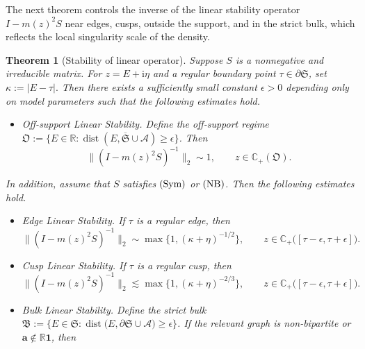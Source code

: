 \documentclass[11pt,twoside, a4paper]{article}
\numberwithin{equation}{section}
\numberwithin{figure}{section}
\theoremstyle{plain} %
\newtheorem{theorem}{Theorem}[section]
\theoremstyle{definition}
\theoremstyle{remark}
\newcommand{\1} {\mspace{1 mu}}
\newcommand{\2} {\mspace{2 mu}}
\newcommand{\R} {\mathbb{R}}
\newcommand{\C} {{\mathbb{C}}}
\DeclareMathOperator{\dist}{dist}
\begin{document}
\medskip
The next theorem controls the inverse of the linear stability operator
\(I-m(z)^2S\) near edges, cusps, outside the support, and in the strict bulk, which reflects the local singularity scale of the density.
\begin{theorem}[Stability of linear operator]\label{thm.stability}
    Suppose $S$ is a nonnegative and irreducible matrix. For \(z=E+\mathrm i\eta\) and a regular boundary point
    \(\tau\in\partial\mathfrak S\), set
    $
        \kappa:=|E-\tau|.
    $
    Then there exists a sufficiently small constant $\epsilon>0$ depending only on model parameters such that the following estimates hold.
    \begin{itemize}
    \item \textit{Off-support Linear Stability.} Define the off-support regime $\mathfrak{O}:=\{E\in \R: \dist(E,\overline{\mathfrak{S}}\cup\mathcal{A})\ge\epsilon\}$. Then 
    \begin{equation}\label{eq.off-support-stability}
        \|(I-m(z)^2S)^{-1}\|_2\sim 1,\qquad z\in\C_+(\mathfrak{O}).
    \end{equation}
    \end{itemize}
    \vspace{-3mm}
    In addition, assume that \(S\) satisfies \(\textup{(Sym)}\) or \(\textup{(NB)}\). Then the following estimates hold.
    \begin{itemize}
        \item \textit{Edge Linear Stability.}
    If $\tau$ is a regular edge, then
    \begin{equation}\label{eq.edge-stability}
    \|(I-m(z)^2S)^{-1}\|_2
     \sim\max\big\{1,(\kappa+\eta)^{-1/2}\big\},\qquad z\in \C_+\big([\tau-\epsilon,\tau+\epsilon]\big).
    \end{equation}
        \item \textit{Cusp Linear Stability.} If $\tau$ is a regular cusp, then
        \begin{equation}\label{eq.cusp-stability}
          \|(I-m(z)^2S)^{-1}\|_2\lesssim  \max\big\{1,(\kappa+\eta)^{-2/3}\big\},\qquad z\in \C_+\big([\tau-\epsilon,\tau+\epsilon]\big).
        \end{equation}
        \item \textit{Bulk Linear Stability.} Define the strict bulk $\mathfrak{B}:=\{E\in\mathfrak{S}: \dist\bigl(E,\partial\mathfrak{S}\cup\mathcal A\bigr)\ge \epsilon\}$. If the relevant graph is non-bipartite or $\mathbf{a}\notin \R\mathbf 1$, then
        \begin{equation}\label{bulk-stability}

\end{equation}
\end{itemize}
\end{theorem}
\end{document}

